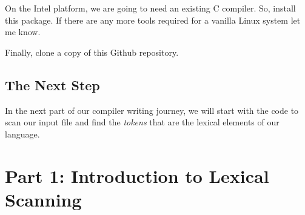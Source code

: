 \documentclass[a4paper,12pt]{article}
\begin{document}
On the Intel platform, we are going to need an existing C compiler. So, install this package.
If there are any more tools required for a vanilla Linux system let me know.

Finally, clone a copy of this Github repository.

\subsection{The Next Step}

In the next part of our compiler writing journey, we will start with the code to scan our input file and find the \textit{tokens} that are the lexical elements of our language.

\section{Part 1: Introduction to Lexical Scanning}
\end{document}
